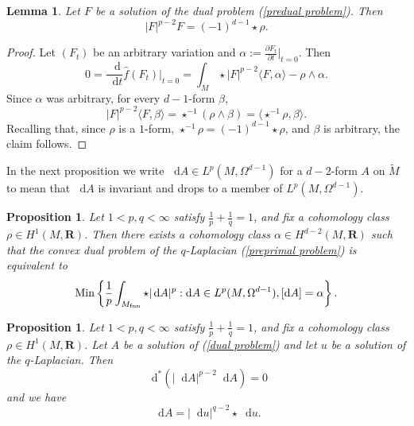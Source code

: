\documentclass[reqno,11pt]{amsart}
\newcommand{\RR}{\mathbf{R}}
\newcommand*\dif{\mathop{}\!\mathrm{d}}
\newcommand{\Min}{\mathrm{Min}}
\newtheorem{lemma}[theorem]{Lemma}
\newtheorem{proposition}[theorem]{Proposition}
\theoremstyle{definition}
\numberwithin{equation}{section}
\begin{document}
\begin{lemma}
Let $F$ be a solution of the dual problem (\ref{predual problem}). Then
\begin{equation}\label{EL of hat G}
|F|^{p - 2} F = (-1)^{d - 1} \star \rho.
\end{equation}
\end{lemma}
\begin{proof}
Let $(F_t)$ be an arbitrary variation and $\alpha := \frac{\partial F_t}{\partial t}|_{t = 0}$. Then 
$$0 = \frac{\dif}{\dif t} \hat f(F_t)\bigg|_{t = 0} = \int_M \star |F|^{p - 2} \langle F, \alpha \rangle - \rho \wedge \alpha.$$
Since $\alpha$ was arbitrary, for every $d-1$-form $\beta$,
$$|F|^{p - 2} \langle F, \beta\rangle = \star^{-1}(\rho \wedge \beta) = \langle \star^{-1} \rho, \beta\rangle.$$
Recalling that, since $\rho$ is a $1$-form, $\star^{-1} \rho = (-1)^{d - 1} \star \rho$, and $\beta$ is arbitrary, the claim follows.
\end{proof}

In the next proposition we write $\dif A \in L^p(M, \Omega^{d - 1})$ for a $d-2$-form $A$ on $\tilde M$ to mean that $\dif A$ is invariant and drops to a member of $L^p(M, \Omega^{d - 1})$.

\begin{proposition}
Let $1 < p, q < \infty$ satisfy $\frac{1}{p} + \frac{1}{q} = 1$, and fix a cohomology class $\rho \in H^1(M, \RR)$.
Then there exists a cohomology class $\alpha \in H^{d - 2}(M, \RR)$ such that the convex dual problem of the $q$-Laplacian (\ref{preprimal problem}) is equivalent to 
\begin{equation}\label{dual problem}
\Min\left\{\frac{1}{p} \int_{M_{\rm fun}} \star |\dif A|^p: \dif A \in L^p(M, \Omega^{d - 1}), [\dif A] = \alpha\right\}.
\end{equation}
\end{proposition}

\begin{proposition}
Let $1 < p, q < \infty$ satisfy $\frac{1}{p} + \frac{1}{q} = 1$, and fix a cohomology class $\rho \in H^1(M, \RR)$.
Let $A$ be a solution of (\ref{dual problem}) and let $u$ be a solution of the $q$-Laplacian. Then
\begin{equation}\label{pMaxwell}
\dif^*(|\dif A|^{p - 2} \dif A) = 0
\end{equation}
and we have
\begin{equation}\label{extremality}
\dif A = |\dif u|^{q - 2} \star \dif u.
\end{equation}
\end{proposition}
\end{document}
